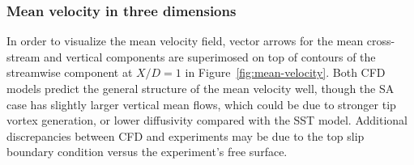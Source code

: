 \documentclass[aip,graphicx]{revtex4-1}
\begin{document}
\subsubsection{Mean velocity in three dimensions}

In order to visualize the mean velocity field, vector arrows for the mean
cross-stream and vertical components are superimosed on top of contours of the
streamwise component at $X/D=1$ in Figure~\ref{fig:mean-velocity}. Both CFD
models predict the general structure of the mean velocity well, though the SA
case has slightly larger vertical mean flows, which could be due to stronger tip
vortex generation, or lower diffusivity compared with the SST model. Additional
discrepancies between CFD and experiments may be due to the top slip boundary
condition versus the experiment's free surface.
\end{document}
